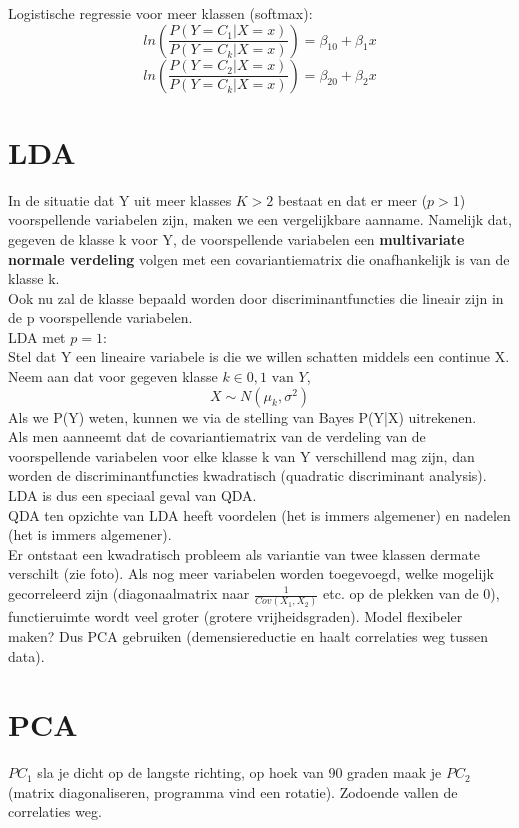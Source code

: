 {\noindent Logistische regressie voor meer klassen (softmax):\\
\[ln(\frac{P(Y=C_1|X=x)}{P(Y=C_k|X=x)})=\beta_{10}+\beta_1x\]
\[ln(\frac{P(Y=C_2|X=x)}{P(Y=C_k|X=x)})=\beta_{20}+\beta_2x\]

\section{LDA}
In de situatie dat Y uit meer klasses $K > 2$ bestaat en dat er
meer ($p > 1$) voorspellende variabelen zijn, maken we een
vergelijkbare aanname. Namelijk dat, gegeven de klasse k voor
Y, de voorspellende variabelen een \textbf{multivariate normale
verdeling} volgen met een covariantiematrix die onafhankelijk
is van de klasse k.\\
Ook nu zal de klasse bepaald worden door
discriminantfuncties die lineair zijn in de p voorspellende
variabelen.\\

\noindent LDA met $p=1$:\\
Stel dat Y een lineaire variabele is die we willen schatten middels een continue X. Neem aan dat voor gegeven klasse $k \in {0, 1} \textrm{ van } Y$,
\[X \sim N(\mu_k,\sigma^2)\]
Als we P(Y) weten, kunnen we via de stelling van Bayes P(Y|X) uitrekenen.\\

\noindent Als men aanneemt dat de covariantiematrix van de verdeling van de voorspellende variabelen voor elke klasse k van Y verschillend mag zijn, dan worden de discriminantfuncties kwadratisch (quadratic discriminant analysis).\\
LDA is dus een speciaal geval van QDA.\\
QDA ten opzichte van LDA heeft voordelen (het is immers algemener) en nadelen (het is immers algemener).\\

\noindent Er ontstaat een kwadratisch probleem als variantie van twee klassen dermate verschilt (zie foto). Als nog meer variabelen worden toegevoegd, welke mogelijk gecorreleerd zijn (diagonaalmatrix naar $\frac{1}{Cov(X_1,X_2)}$ etc. op de plekken van de 0), functieruimte wordt veel groter (grotere vrijheidsgraden). Model flexibeler maken? Dus PCA gebruiken (demensiereductie en haalt correlaties weg tussen data).\\

\section{PCA}
$PC_1$ sla je dicht op de langste richting, op hoek van 90 graden maak je $PC_2$ (matrix diagonaliseren, programma vind een rotatie). Zodoende vallen de correlaties weg. \\

}
